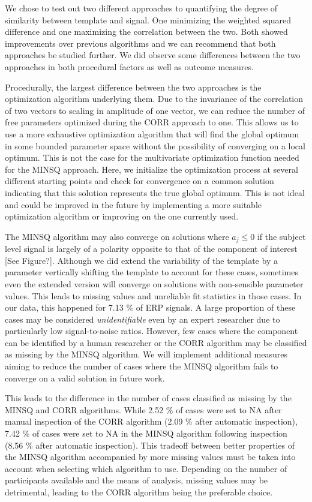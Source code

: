\documentclass[
  man]{apa7}
\begin{document}
We chose to test out two different approaches to quantifying the degree of similarity between template and signal. One minimizing the weighted squared difference and one maximizing the correlation between the two. Both showed improvements over previous algorithms and we can recommend that both approaches be studied further. We did observe some differences between the two approaches in both procedural factors as well as outcome measures.

Procedurally, the largest difference between the two approaches is the optimization algorithm underlying them. Due to the invariance of the correlation of two vectors to scaling in amplitude of one vector, we can reduce the number of free parameters optimized during the CORR approach to one. This allows us to use a more exhaustive optimization algorithm that will find the global optimum in some bounded parameter space without the possibility of converging on a local optimum. This is not the case for the multivariate optimization function needed for the MINSQ approach. Here, we initialize the optimization process at several different starting points and check for convergence on a common solution indicating that this solution represents the true global optimum. This is not ideal and could be improved in the future by implementing a more suitable optimization algorithm or improving on the one currently used.

The MINSQ algorithm may also converge on solutions where \(a_j \le 0\) if the subject level signal is largely of a polarity opposite to that of the component of interest {[}See Figure?{]}. Although we did extend the variability of the template by a parameter vertically shifting the template to account for these cases, sometimes even the extended version will converge on solutions with non-sensible parameter values. This leads to missing values and unreliable fit statistics in those cases. In our data, this happened for 7.13 \% of ERP signals. A large proportion of these cases may be considered \emph{unidentifiable} even by an expert researcher due to particularly low signal-to-noise ratios. However, few cases where the component can be identified by a human researcher or the CORR algorithm may be classified as missing by the MINSQ algorithm. We will implement additional measures aiming to reduce the number of cases where the MINSQ algorithm fails to converge on a valid solution in future work.

This leads to the difference in the number of cases classified as missing by the MINSQ and CORR algorithms. While 2.52 \% of cases were set to NA after manual inspection of the CORR algorithm (2.09 \% after automatic inspection), 7.42 \% of cases were set to NA in the MINSQ algorithm following inspection (8.56 \% after automatic inspection). This tradeoff between better properties of the MINSQ algorithm accompanied by more missing values must be taken into account when selecting which algorithm to use. Depending on the number of participants available and the means of analysis, missing values may be detrimental, leading to the CORR algorithm being the preferable choice.
\end{document}
